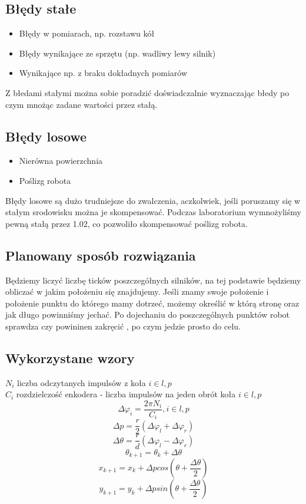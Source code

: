 \documentclass[paper=a4, fontsize=11pt]{scrartcl} %
\numberwithin{equation}{section} %
\numberwithin{figure}{section} %
\numberwithin{table}{section} %
\begin{document}
\subsection{Błędy stałe}
\begin{itemize}
\item Błędy w pomiarach, np. rozstawu kół
\item Błędy wynikające ze sprzętu (np. wadliwy lewy silnik)
\item Wynikające np. z braku dokładnych pomiarów
\end{itemize}
Z błedami stałymi można sobie poradzić doświadczalnie wyznaczając błedy po czym mnożąc zadane  wartości przez stałą. 
\subsection{Błędy losowe}
\begin{itemize}
\item Nierówna powierzchnia 
\item Poślizg robota
\end{itemize}
Błędy losowe są dużo trudniejsze do zwalczenia, aczkolwiek, jeśli poruszamy się w stałym srodowisku można je skompensować. Podczas laboratorium  wymnożyliśmy pewną stałą przez 1.02, co pozwoliło skompensować poślizg robota.  
\subsection{Planowany sposób rozwiązania}
Będziemy liczyć liczbę ticków poszczegółnych silników, na tej podstawie będziemy obliczać w jakim położeniu się znajdujemy. Jeśli znamy swoje położenie i położenie punktu do którego mamy dotrzeć, możemy określić w którą stronę oraz jak długo powinniśmy jechać.  Po dojechaniu do poszczególnych punktów robot sprawdza czy powininen zakręcić , po czym jedzie prosto  do celu.
\subsection{Wykorzystane wzory}
\(N_i\) liczba odczytanych impulsów z koła \(i \in l, p\)\\
\(C_i\) rozdzielczość enkodera - liczba impulsów na jeden obrót koła \(i \in l, p\)
\[
\Delta \varphi_i = \frac{2\pi N_i}{C_i}, i \in l, p
\]\[
\Delta p = \frac{r}{2} \left( \Delta \varphi_l + \Delta \varphi_r \right)
\]\[
\Delta \theta = \frac{r}{d} \left( \Delta \varphi_l - \Delta \varphi_r \right)
\]\[
\theta_{k+1} = \theta_k + \Delta \theta
\]\[
x_{k+1} = x_k + \Delta p cos\left( \theta + \frac{\Delta \theta}{2} \right)
\]\[
y_{k+1} = y_k + \Delta p sin\left( \theta + \frac{\Delta \theta}{2} \right)
\] 
\end{document}
